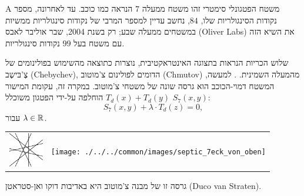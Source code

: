 \begin{surferPage}[הֶפטַגוֹן]{A משטח הפטגונלי סימטרי}
    זהו משטח ממעלה $7$ הנראה כמו כוכב.  
    עד לאחרונה, מספר נקודות הסינגולריות שלו, $84$, נחשב עדיין
    למספר המרבי של נקודות סינגולריות ממשיות במשטחים ממעלה שבע;
    רק בשנת 2004, שבר אוליבר לאבס (Oliver Labs) את השיא הזה עם משטח בעל $99$ נקודות סינגולריות.
  
  
 שלוש הכריות הנראות בתצוגה האינטראקטיבית, 
    נוצרות כתוצאה מהשימוש בפולינומים של צֶ'בּישֶב (Chebychev), הדומים לפולינום צ'מוטוב (Chmutov) מהמעלה השמינית.
    . 
    למעשה, המשטח דמוי-הכוכב הוא גרסה שונה של משטחי צ'מוטוב.
    במקרה זה, עקומת המישור $T_d(x)+T_d(y)$ הוחלפה על-ידי הפטגון משוכלל
    $S_7(x,y)$: 
   \[S_7(x,y) + \lambda \cdot T_d(z) = 0,\]
    עבור $\lambda\in{\mathbb R}$. 
    \vspace*{-0.3em}
    \begin{center}
      \begin{tabular}{c@{\qquad}c}
        \includegraphics[height=1.5cm]{./../../common/images/labsseptic1.pdf}
        &
        \texttt{[image: ./../../common/images/septic\_7eck\_von\_oben]}
      \end{tabular}
    \end{center}
    \vspace*{-0.3em}   
   גרסה זו של מבנה צ'מוטוב היא באדיבות דוקו ואן-סטראטן (Duco van Straten).
\end{surferPage}
